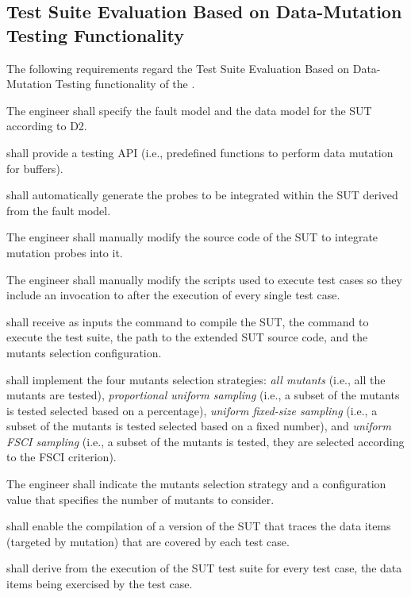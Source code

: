 
\subsection{Test Suite Evaluation Based on Data-Mutation Testing Functionality}
\label{sec:dataDriven}

The following requirements regard the Test Suite Evaluation Based on Data-Mutation Testing functionality of the \FAQAS.

\RQ{} The engineer shall specify the fault model and the data model for the SUT according to D2.

\RQ{} \FAQAS shall provide a testing API (i.e., predefined functions to perform data mutation for buffers).

\RQ{} \FAQAS shall automatically generate the probes to be integrated within the SUT derived from the fault model.

\RQ{} The engineer shall manually modify the source code of the SUT to integrate mutation probes into it.

\RQ{} The engineer shall manually modify the scripts used to execute test cases so they include an invocation to \FAQAS after the execution of every single test case. 

\RQ{} \FAQAS shall receive as inputs the command to compile the SUT, the command to execute the test suite, the path to the extended SUT source code, and the mutants selection configuration. 

\RQ{} \FAQAS shall implement the four mutants selection strategies: \emph{all mutants} (i.e., all the mutants are tested), \emph{proportional uniform sampling} (i.e., a subset of the mutants is tested selected based on a percentage), \emph{uniform fixed-size sampling} (i.e., a subset of the mutants is tested selected based on a fixed number), and \emph{uniform FSCI sampling} (i.e., a subset of the mutants is tested, they are selected according to the FSCI criterion).

\RQ{} The engineer shall indicate the mutants selection strategy and a configuration value that specifies the number of mutants to consider.

\RQ{} \FAQAS shall enable the compilation of a version of the SUT that traces the data items (targeted by mutation) that are covered by each test case.

\RQ{} \FAQAS shall derive from the execution of the SUT test suite for every test case, the data items being exercised by the test case.

